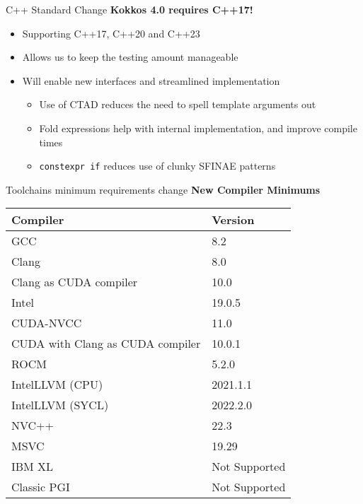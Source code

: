 

\begin{frame}[fragile]{C++ Standard Change}
\textbf{Kokkos 4.0 requires C++17!}

\begin{itemize}
  \item {Supporting C++17, C++20 and C++23}
  \item {Allows us to keep the testing amount manageable}
  \item {Will enable new interfaces and streamlined implementation}
  \begin{itemize}
    \item {Use of CTAD reduces the need to spell template arguments out}
    \item {Fold expressions help with internal implementation, and improve compile times}
    \item {\texttt{constexpr if} reduces use of clunky SFINAE patterns}
  \end{itemize}
\end{itemize}
\end{frame}


\begin{frame}[fragile]{Toolchains minimum requirements change}
\textbf{New Compiler Minimums}

\vspace{10pt}
\small
\begin{tabular}{ll}
\textbf{Compiler} & \textbf{Version} \\
\hline
GCC & 8.2 \\
Clang & 8.0 \\
Clang as CUDA compiler & 10.0 \\
Intel & 19.0.5 \\
CUDA-NVCC & 11.0 \\
CUDA with Clang as CUDA compiler & 10.0.1 \\
ROCM & 5.2.0 \\
IntelLLVM (CPU) & 2021.1.1 \\
IntelLLVM (SYCL) & 2022.2.0 \\
NVC++ & 22.3 \\
MSVC & 19.29 \\
IBM XL & Not Supported \\
Classic PGI & Not Supported \\
\end{tabular}
\end{frame}

